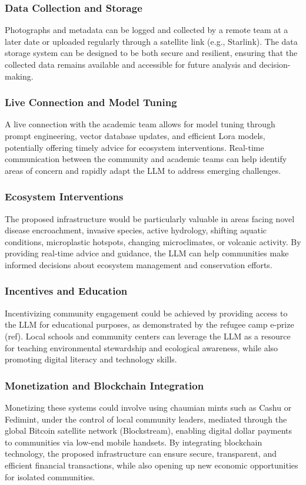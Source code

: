 \subsubsection{Data Collection and Storage}
Photographs and metadata can be logged and collected by a remote team at a later date or uploaded regularly through a satellite link (e.g., Starlink). The data storage system can be designed to be both secure and resilient, ensuring that the collected data remains available and accessible for future analysis and decision-making.

\subsubsection{Live Connection and Model Tuning}
A live connection with the academic team allows for model tuning through prompt engineering, vector database updates, and efficient Lora models, potentially offering timely advice for ecosystem interventions. Real-time communication between the community and academic teams can help identify areas of concern and rapidly adapt the LLM to address emerging challenges.

\subsubsection{Ecosystem Interventions}
The proposed infrastructure would be particularly valuable in areas facing novel disease encroachment, invasive species, active hydrology, shifting aquatic conditions, microplastic hotspots, changing microclimates, or volcanic activity. By providing real-time advice and guidance, the LLM can help communities make informed decisions about ecosystem management and conservation efforts.

\subsubsection{Incentives and Education}
Incentivizing community engagement could be achieved by providing access to the LLM for educational purposes, as demonstrated by the refugee camp e-prize (ref). Local schools and community centers can leverage the LLM as a resource for teaching environmental stewardship and ecological awareness, while also promoting digital literacy and technology skills.

\subsubsection{Monetization and Blockchain Integration}
Monetizing these systems could involve using chaumian mints such as Cashu or Fedimint, under the control of local community leaders, mediated through the global Bitcoin satellite network (Blockstream), enabling digital dollar payments to communities via low-end mobile handsets. By integrating blockchain technology, the proposed infrastructure can ensure secure, transparent, and efficient financial transactions, while also opening up new economic opportunities for isolated communities.

